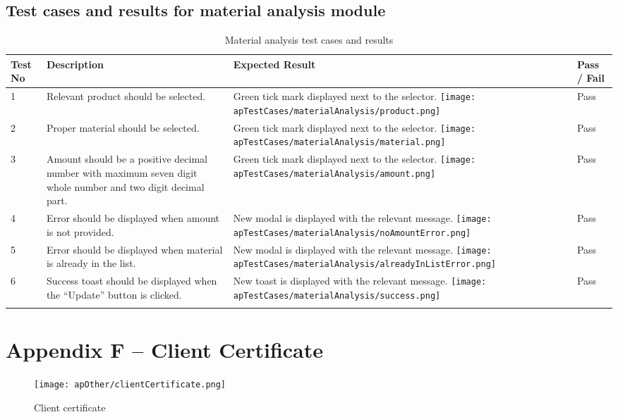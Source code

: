\documentclass[12pt]{report}
\begin{document}
\section{Test cases and results for material analysis module}

\begin{longtable}{ | p{1cm} | p{5cm} | p{5cm} | p{2cm} | }
	\hline
	\bf{Test No} & \bf{Description} & \bf{Expected Result} & \bf{Pass / Fail} \\
	\hline
	1
	             &
	Relevant product should be selected.
	             &
	Green tick mark displayed next to the selector.\newline
	\texttt{[image: apTestCases/materialAnalysis/product.png]}
	             &
	Pass                                                                      \\
	\hline
	2
	             &
	Proper material should be selected.
	             &
	Green tick mark displayed next to the selector.\newline
	\texttt{[image: apTestCases/materialAnalysis/material.png]}
	             &
	Pass                                                                      \\
	\hline
	3
	             &
	Amount should be a positive decimal number with maximum seven digit whole number and two digit decimal part.
	             &
	Green tick mark displayed next to the selector.\newline
	\texttt{[image: apTestCases/materialAnalysis/amount.png]}
	             &
	Pass                                                                      \\
	\hline
	4
	             &
	Error should be displayed when amount is not provided.
	             &
	New modal is displayed with the relevant message.\newline
	\texttt{[image: apTestCases/materialAnalysis/noAmountError.png]}
	             &
	Pass                                                                      \\
	\hline
	5
	             &
	Error should be displayed when material is already in the list.
	             &
	New modal is displayed with the relevant message.\newline
	\texttt{[image: apTestCases/materialAnalysis/alreadyInListError.png]}
	             &
	Pass                                                                      \\
	\hline
	6
	             &
	Success toast should be displayed when the ``Update'' button is clicked.
	             &
	New toast is displayed with the relevant message.\newline
	\texttt{[image: apTestCases/materialAnalysis/success.png]}
	             &
	Pass                                                                      \\
	\hline
	\caption{Material analysis test cases and results}
\end{longtable}



\chapter*{\Huge Appendix F – Client Certificate}
\begin{figure}[H]
	\centering
	\texttt{[image: apOther/clientCertificate.png]}
	\caption{Client certificate}
\end{figure}
\end{document}
